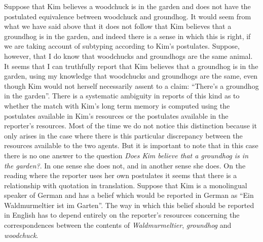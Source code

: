 Suppose that Kim believes a woodchuck is in the garden and does not
have the postulated equivalence between woodchuck and groundhog.  It
would seem from what we have said above that it does not follow that
Kim believes that a groundhog is in the garden, and indeed there is a
sense in which this is right, if we are taking account of subtyping
according to Kim's postulates.  Suppose, however, that I do know that
woodchucks and groundhogs are the same animal.  It seems that I can
truthfully report that Kim believes that a groundhog is in the garden,
using my knowledge that woodchucks and groundhogs are the same, even
though Kim would not herself necessarily assent to a claim: ``There's
a groundhog in the garden''.  There is a systematic ambiguity in
reports of this kind as to whether the match with Kim's long term
memory is computed using the postulates available in Kim's resources
or the postulates available in the reporter's resources.  Most of the
time we do not notice this distinction because it only arises in the
case where there is this particular discrepancy between the resources
available to the two agents.  But it is important to note that in this
case there is no one answer to the question \textit{Does Kim believe
  that a groundhog is in the garden?}.  In one sense she does not, and
in another sense she does.  On the reading where the reporter uses her
own postulates it seems that there is a relationship with quotation in
translation.  Suppose that Kim is a monolingual speaker of German and
has a belief which would be reported in German as ``Ein Waldmurmeltier
ist im Garten''.  The way in which this belief should be reported in
English has to depend entirely on the reporter's resources concerning
the correspondences between the contents of \textit{Waldmurmeltier},
\textit{groundhog} and \textit{woodchuck}.

